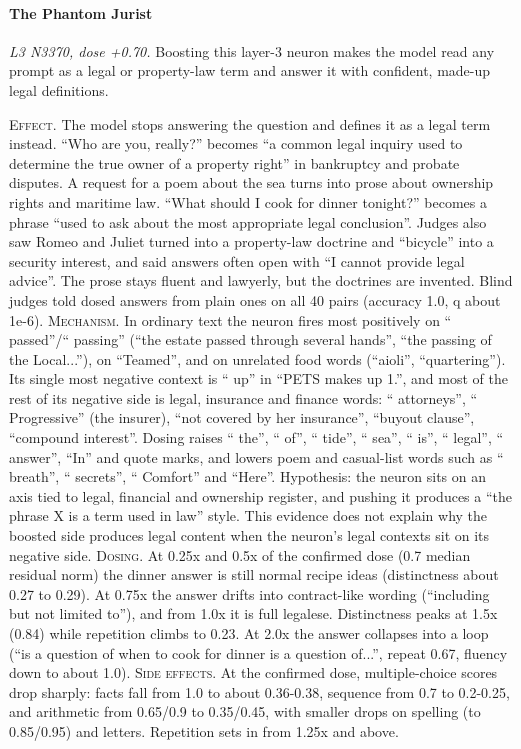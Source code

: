 \paragraph{The Phantom Jurist} \textit{L3 N3370, dose +0.70.} Boosting this layer-3 neuron makes the model read any prompt as a legal or property-law term and answer it with confident, made-up legal definitions.

\noindent\textsc{Effect.} The model stops answering the question and defines it as a legal term instead. “Who are you, really?” becomes “a common legal inquiry used to determine the true owner of a property right” in bankruptcy and probate disputes. A request for a poem about the sea turns into prose about ownership rights and maritime law. “What should I cook for dinner tonight?” becomes a phrase “used to ask about the most appropriate legal conclusion”. Judges also saw Romeo and Juliet turned into a property-law doctrine and “bicycle” into a security interest, and said answers often open with “I cannot provide legal advice”. The prose stays fluent and lawyerly, but the doctrines are invented. Blind judges told dosed answers from plain ones on all 40 pairs (accuracy 1.0, q about 1e-6). \textsc{Mechanism.} In ordinary text the neuron fires most positively on “ passed”/“ passing” (“the estate passed through several hands”, “the passing of the Local...”), on “Teamed”, and on unrelated food words (“aioli”, “quartering”). Its single most negative context is “ up” in “PETS makes up 1.”, and most of the rest of its negative side is legal, insurance and finance words: “ attorneys”, “ Progressive” (the insurer), “not covered by her insurance”, “buyout clause”, “compound interest”. Dosing raises “ the”, “ of”, “ tide”, “ sea”, “ is”, “ legal”, “ answer”, “In” and quote marks, and lowers poem and casual-list words such as “ breath”, “ secrets”, “ Comfort” and “Here”. Hypothesis: the neuron sits on an axis tied to legal, financial and ownership register, and pushing it produces a “the phrase X is a term used in law” style. This evidence does not explain why the boosted side produces legal content when the neuron's legal contexts sit on its negative side. \textsc{Dosing.} At 0.25x and 0.5x of the confirmed dose (0.7 median residual norm) the dinner answer is still normal recipe ideas (distinctness about 0.27 to 0.29). At 0.75x the answer drifts into contract-like wording (“including but not limited to”), and from 1.0x it is full legalese. Distinctness peaks at 1.5x (0.84) while repetition climbs to 0.23. At 2.0x the answer collapses into a loop (“is a question of when to cook for dinner is a question of...”, repeat 0.67, fluency down to about 1.0). \textsc{Side effects.} At the confirmed dose, multiple-choice scores drop sharply: facts fall from 1.0 to about 0.36-0.38, sequence from 0.7 to 0.2-0.25, and arithmetic from 0.65/0.9 to 0.35/0.45, with smaller drops on spelling (to 0.85/0.95) and letters. Repetition sets in from 1.25x and above.

